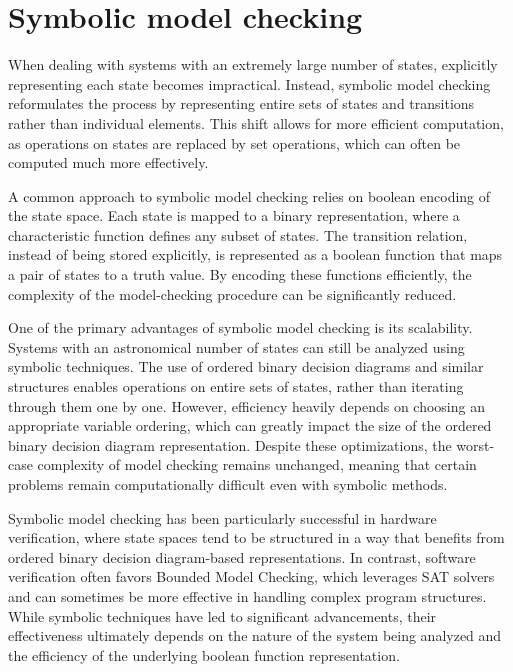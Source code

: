 \section{Symbolic model checking}

When dealing with systems with an extremely large number of states, explicitly representing each state becomes impractical. 
Instead, symbolic model checking reformulates the process by representing entire sets of states and transitions rather than individual elements. 
This shift allows for more efficient computation, as operations on states are replaced by set operations, which can often be computed much more effectively.

A common approach to symbolic model checking relies on boolean encoding of the state space. 
Each state is mapped to a binary representation, where a characteristic function defines any subset of states. 
The transition relation, instead of being stored explicitly, is represented as a boolean function that maps a pair of states to a truth value. 
By encoding these functions efficiently, the complexity of the model-checking procedure can be significantly reduced. 

One of the primary advantages of symbolic model checking is its scalability. 
Systems with an astronomical number of states can still be analyzed using symbolic techniques. 
The use of ordered binary decision diagrams and similar structures enables operations on entire sets of states, rather than iterating through them one by one. 
However, efficiency heavily depends on choosing an appropriate variable ordering, which can greatly impact the size of the ordered binary decision diagram representation. 
Despite these optimizations, the worst-case complexity of model checking remains unchanged, meaning that certain problems remain computationally difficult even with symbolic methods.

Symbolic model checking has been particularly successful in hardware verification, where state spaces tend to be structured in a way that benefits from ordered binary decision diagram-based representations. 
In contrast, software verification often favors Bounded Model Checking, which leverages SAT solvers and can sometimes be more effective in handling complex program structures. 
While symbolic techniques have led to significant advancements, their effectiveness ultimately depends on the nature of the system being analyzed and the efficiency of the underlying boolean function representation.